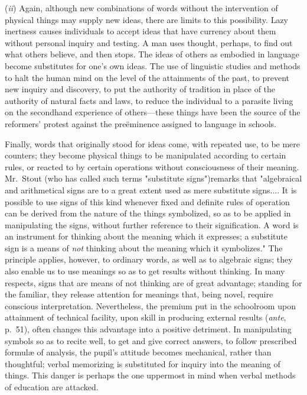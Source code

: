 \documentclass[letterpaper]{book}
\begin{document}

(\emph{ii}) Again, although new combinations of words without the
intervention of physical things may supply new ideas, there are limits
to this possibility. Lazy inertness causes individuals to accept ideas
that have currency about them without personal inquiry and testing. A
man uses thought, perhaps, to find out what others believe, and then
stops. The ideas of others as embodied in language become substitutes
for one's own ideas. The use of linguistic studies and methods to halt
the human mind on the level of the attainments of the past, to prevent
new inquiry and discovery, to put the authority of tradition in place of
the authority of natural facts and laws, to reduce the individual to a
parasite living on the secondhand experience of others---these things
have been the source of the reformers' protest against the preëminence
assigned to language in schools.


Finally, words that originally stood for ideas come, with repeated use,
to be mere counters; they become physical things to be manipulated
according to certain rules, or reacted to by certain operations without
consciousness of their meaning. Mr.\ Stout (who has called such terms
"substitute signs")remarks that "algebraical and arithmetical signs are
to a great extent used as mere substitute signs.... It is possible to
use signs of this kind whenever fixed and definite rules of
operation
can be derived from the nature of the things symbolized, so as to be
applied in manipulating the signs, without further reference to their
signification. A word is an instrument for thinking about the meaning
which it expresses; a substitute sign is a means of \emph{not} thinking
about the meaning which it symbolizes." The principle applies, however,
to ordinary words, as well as to algebraic signs; they also enable us to
use meanings so as to get results without thinking. In many respects,
signs that are means of not thinking are of great advantage; standing
for the familiar, they release attention for meanings that, being novel,
require conscious interpretation. Nevertheless, the premium put in the
schoolroom upon attainment of technical facility, upon skill in
producing external results (\emph{ante}, p.\ 51), often changes this
advantage into a positive detriment. In manipulating symbols so as to
recite well, to get and give correct answers, to follow prescribed
formulæ of analysis, the pupil's attitude becomes mechanical, rather
than thoughtful; verbal memorizing is substituted for inquiry into the
meaning of things. This danger is perhaps the one uppermost in mind when
verbal methods of education are attacked.
\end{document}
